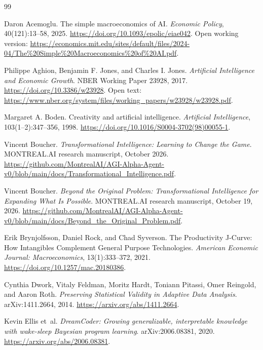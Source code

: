 \documentclass[11pt,letterpaper]{article}
\newcommand{\1}{\mathbf 1}
\theoremstyle{remark}\newtheorem{remark}{Remark}[section]
\begin{document}
\clearpage
\begin{thebibliography}{99}
\setlength{\itemsep}{0.14em}\setlength{\parsep}{0pt}\small

Daron Acemoglu. The simple macroeconomics of AI. \emph{Economic Policy}, 40(121):13--58, 2025. \url{https://doi.org/10.1093/epolic/eiae042}. Open working version: \url{https://economics.mit.edu/sites/default/files/2024-04/The%20Simple%20Macroeconomics%20of%20AI.pdf}.

Philippe Aghion, Benjamin F. Jones, and Charles I. Jones. \emph{Artificial Intelligence and Economic Growth}. NBER Working Paper 23928, 2017. \url{https://doi.org/10.3386/w23928}. Open text: \url{https://www.nber.org/system/files/working_papers/w23928/w23928.pdf}.

Margaret A. Boden. Creativity and artificial intelligence. \emph{Artificial Intelligence}, 103(1--2):347--356, 1998. \url{https://doi.org/10.1016/S0004-3702(98)00055-1}.

Vincent Boucher. \emph{Transformational Intelligence: Learning to Change the Game}. MONTREAL.AI research manuscript, October 2026. \url{https://github.com/MontrealAI/AGI-Alpha-Agent-v0/blob/main/docs/Transformational_Intelligence.pdf}.

Vincent Boucher. \emph{Beyond the Original Problem: Transformational Intelligence for Expanding What Is Possible}. MONTREAL.AI research manuscript, October 19, 2026. \url{https://github.com/MontrealAI/AGI-Alpha-Agent-v0/blob/main/docs/Beyond_the_Original_Problem.pdf}.

Erik Brynjolfsson, Daniel Rock, and Chad Syverson. The Productivity J-Curve: How Intangibles Complement General Purpose Technologies. \emph{American Economic Journal: Macroeconomics}, 13(1):333--372, 2021. \url{https://doi.org/10.1257/mac.20180386}.

Cynthia Dwork, Vitaly Feldman, Moritz Hardt, Toniann Pitassi, Omer Reingold, and Aaron Roth. \emph{Preserving Statistical Validity in Adaptive Data Analysis}. arXiv:1411.2664, 2014. \url{https://arxiv.org/abs/1411.2664}.

Kevin Ellis et~al. \emph{DreamCoder: Growing generalizable, interpretable knowledge with wake-sleep Bayesian program learning}. arXiv:2006.08381, 2020. \url{https://arxiv.org/abs/2006.08381}.


\end{thebibliography}
\end{document}
